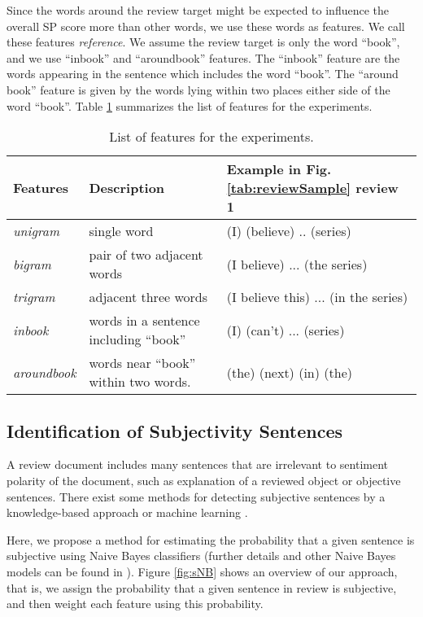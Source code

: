 \documentclass[japanese]{jnlp_1.3d}
\begin{document}
Since the words around the review target might be expected to influence the overall SP score more than other words, we use these words as features. We call these features \textit{reference}. We assume the review target is only the word ``book'', and we use ``inbook'' and ``aroundbook'' features. The ``inbook'' feature are the words appearing in the sentence which includes the word ``book''. The ``around book'' feature is given by the words lying within two places either side of the word ``book''. Table \ref{tab:features} summarizes the list of features for the experiments.

\begin{table}[b]
	\caption{List of features for the experiments.}
	\label{tab:features}
	  \begin{center}
  \begin{tabular}{|l|l|l|} \hline
  Features             & Description & Example in Fig.\ref{tab:reviewSample} review 1  \\ \hline
  \textit{unigram}     & single word & (I) (believe) .. (series)\\
  \textit{bigram}     & pair of two adjacent words & (I believe) ... (the series)\\ 
  \textit{trigram}    & adjacent three words & (I believe this) ... (in the series)  \\
  \textit{inbook}     & words in a sentence including ``book''  & (I) (can't) ... (series)\\
  \textit{aroundbook} & words near ``book'' within two words. & (the) (next) (in) (the)\\ \hline
  \end{tabular}
  \end{center}
\end{table}


\subsection{Identification of Subjectivity Sentences}
\label{idenSub}
A review document includes many sentences that are irrelevant to sentiment polarity of the document, such as explanation of a reviewed object or objective sentences. There exist some methods for detecting subjective sentences by a knowledge-based approach or machine learning \cite{Hong2003,Pang2004}. 

Here, we propose a method for estimating the probability that a given sentence is subjective using Naive Bayes classifiers (further details and other Naive Bayes models can be found in \cite{Nigam2000,Mccallum1998}). Figure \ref{fig:sNB} shows an overview of our approach, that is, we assign the probability that a given sentence in review is subjective, and then weight each feature using this probability.
\end{document}
